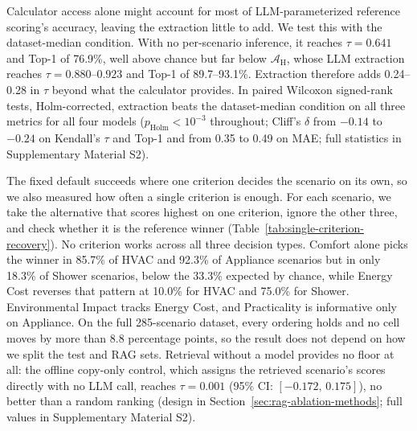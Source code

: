 \documentclass[final,3p,times]{elsarticle}
\begin{document}
Calculator access alone might account for most of LLM-parameterized reference scoring's accuracy, leaving the extraction little to add. We test this with the dataset-median condition. With no per-scenario inference, it reaches $\tau = 0.641$ and Top-1 of 76.9\%, well above chance but far below $\mathcal{A}_{\text{H}}$, whose LLM extraction reaches $\tau = 0.880$--$0.923$ and Top-1 of 89.7--93.1\%. Extraction therefore adds 0.24--0.28 in $\tau$ beyond what the calculator provides. In paired Wilcoxon signed-rank tests, Holm-corrected, extraction beats the dataset-median condition on all three metrics for all four models ($p_{\text{Holm}} < 10^{-3}$ throughout; Cliff's $\delta$ from $-0.14$ to $-0.24$ on Kendall's $\tau$ and Top-1 and from 0.35 to 0.49 on MAE; full statistics in Supplementary Material S2).

The fixed default succeeds where one criterion decides the scenario on its own, so we also measured how often a single criterion is enough. For each scenario, we take the alternative that scores highest on one criterion, ignore the other three, and check whether it is the reference winner (Table~\ref{tab:single-criterion-recovery}). No criterion works across all three decision types. Comfort alone picks the winner in 85.7\% of HVAC and 92.3\% of Appliance scenarios but in only 18.3\% of Shower scenarios, below the 33.3\% expected by chance, while Energy Cost reverses that pattern at 10.0\% for HVAC and 75.0\% for Shower. Environmental Impact tracks Energy Cost, and Practicality is informative only on Appliance. On the full 285-scenario dataset, every ordering holds and no cell moves by more than 8.8 percentage points, so the result does not depend on how we split the test and RAG sets. Retrieval without a model provides no floor at all: the offline copy-only control, which assigns the retrieved scenario's scores directly with no LLM call, reaches $\tau = 0.001$ (95\% CI: $[-0.172,\, 0.175]$), no better than a random ranking (design in Section~\ref{sec:rag-ablation-methods}; full values in Supplementary Material S2).
\end{document}
